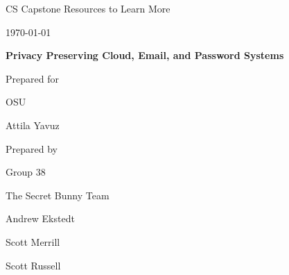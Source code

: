 
\def \CapstoneTeamName{		The Secret Bunny Team}
\def \CapstoneTeamNumber{		38}
\def \GroupMemberOne{			Andrew Ekstedt}
\def \GroupMemberTwo{			Scott Merrill}
\def \GroupMemberThree{			Scott Russell}
\def \CapstoneProjectName{		Privacy Preserving Cloud, Email, and Password Systems}
\def \CapstoneSponsorCompany{	OSU}
\def \CapstoneSponsorPerson{		Attila Yavuz}

\def \DocType{	%
                Resources to Learn More
				}
\renewcommand{\NameSigPair}[1]{#1}


\begin{titlepage}
    \begin{singlespace}
        \hfill 
        \par\vspace{.2in}
        \centering
        \scshape{
            \huge CS Capstone \DocType \par
            {\large\today}\par
            \vspace{.5in}
            \textbf{\Huge\CapstoneProjectName}\par
            \vfill
            {\large Prepared for}\par
            \Huge \CapstoneSponsorCompany\par
            \vspace{5pt}
            {\Large\NameSigPair{\CapstoneSponsorPerson}\par}
            {\large Prepared by }\par
            Group\CapstoneTeamNumber\par
            \CapstoneTeamName\par 
            \vspace{5pt}
            {\Large
                \NameSigPair{\GroupMemberOne}\par
                \NameSigPair{\GroupMemberTwo}\par
                \NameSigPair{\GroupMemberThree}\par           
            }
            \vspace{20pt}
        }
        \begin{abstract}
        \end{abstract}     
    \end{singlespace}
\end{titlepage}


